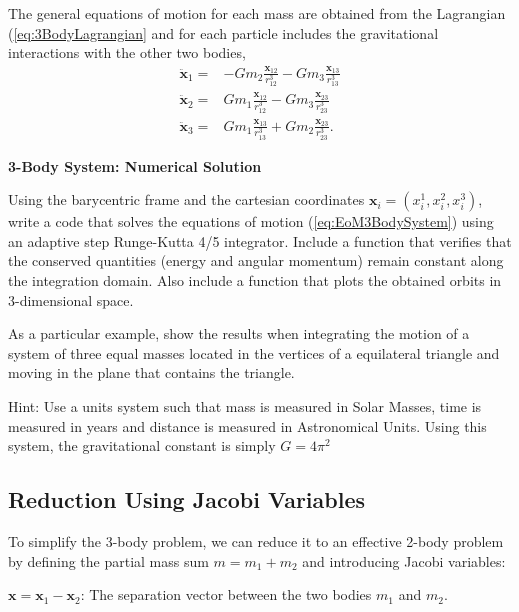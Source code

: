 The general equations of motion for each mass are obtained from the Lagrangian (\ref{eq:3BodyLagrangian} and for each particle includes the gravitational interactions with the other two bodies,
\begin{subequations}
    \begin{align}
    \ddot{\textbf{x}}_1 = &-Gm_2\frac{\textbf{x}_{12}}{r_{12}^3} - Gm_3\frac{\textbf{x}_{13}}{r_{13}^3}\\
    \ddot{\textbf{x}}_2 = &Gm_1\frac{\textbf{x}_{12}}{r_{12}^3} - Gm_3\frac{\textbf{x}_{23}}{r_{23}^3}\\
    \ddot{\textbf{x}}_3 = &Gm_1\frac{\textbf{x}_{13}}{r_{13}^3} + Gm_2\frac{\textbf{x}_{23}}{r_{23}^3}.
\end{align} \label{eq:EoM3BodySystem}
\end{subequations}

\begin{exercise}
 \textbf{3-Body System: Numerical Solution}
 
 Using the barycentric frame and the cartesian coordinates $\textbf{x}_i = (x^1_i, x^2_i, x^3_i)$, write a code that solves the equations of motion (\ref{eq:EoM3BodySystem}) using an adaptive step Runge-Kutta 4/5 integrator. Include a function that verifies that the conserved quantities (energy and angular momentum) remain constant along the integration domain. Also include a function that plots the obtained orbits in 3-dimensional space.

 As a particular example, show the results when integrating the motion of a system of three equal masses located in the vertices of a equilateral triangle and moving in the plane that contains the triangle.

Hint: Use a units system such that mass is measured in Solar Masses, time is measured in years and distance is measured in Astronomical Units. Using this system, the gravitational constant is simply $G=4\pi^2$
\end{exercise}



\subsection{Reduction Using Jacobi Variables}

To simplify the 3-body problem, we can reduce it to an effective 2-body problem by defining the partial mass sum $m = m_1 + m_2$ and introducing Jacobi variables:

$\textbf{x} = \textbf{x}_1 - \textbf{x}_2$: The separation vector between the two bodies $m_1$ and $m_2$.

